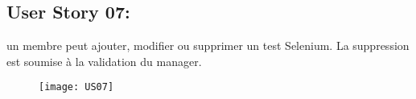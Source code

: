 \newpage
\subsection{User Story 07:}
un membre peut ajouter, modifier ou supprimer un test Selenium. La suppression est soumise à la validation
du manager.


\begin{figure}[!h]
  \begin{center}
        \texttt{[image: US07]}
        \label{US07-dia}
  \end{center}
\end{figure}